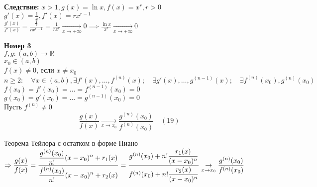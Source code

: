 \textbf{Следствие:} $x>1, g(x)=\ln {x}, f(x)=x^{r}, r>0$ \\
$g'(x)=\displaystyle\frac{1}{x}, f'(x)=rx^{r-1}$ \\
$\displaystyle\frac{g'(x)}{f'(x)}=\displaystyle\frac{\displaystyle\frac{1}{x}}{rx^{r-1}}=\displaystyle\frac{1}{rx^{r}} \underset{x\to +\infty}{\to} 0 \implies \displaystyle\frac{\ln {x}}{x^{r}} \underset{x\to +\infty}{\to} 0$
\begin{theorem}\textbf{Номер 3}\\
	$f,g: (a,b) \to \mathbb{R}$ \\
	$x_0\in(a,b)$ \\
	$f(x)\neq 0$, если $x\neq x_0$\\
	$n\ge 2: \quad \forall x \in (a,b), \exists f'(x),\ldots,f^{(n)}(x); \quad \exists g'(x),\ldots,g^{(n-1)}(x); \quad \exists f^{(n)}(x_0), g^{(n)}(x_0)$ \\
	$f(x_0)=f'(x_0)=\ldots=f^{(n-1)}(x_0)=0$ \\
	$g(x_0)=g'(x_0)=\ldots=g^{(n-1)}(x_0)=0$ \\
	Пусть $f^{(n)}\neq 0$ \\
	\[
	\displaystyle\frac{g(x)}{f(x)} \underset{x\to x_0}{\to} \displaystyle\frac{g^{(n)}(x_0)}{f^{(n)}(x_0)} \quad (19)
	\] 
\end{theorem}
\begin{replacementproof}
	 Теорема Тейлора с остатком в форме Пиано $\implies \\ \displaystyle\frac{g(x)}{f(x)}=\displaystyle\frac{\displaystyle\frac{g^{(n)}(x_0)}{n!}(x-x_0)^{n}+r_1(x)}{\displaystyle\frac{f^{(n)}(x_0)}{n!}(x-x_0)^{n}+r_2(x)}=\displaystyle\frac{g^{(n)}(x_0)+n!\displaystyle\frac{r_1(x)}{(x-x_0)^{n}}}{f^{(n)}(x_0)+n!\displaystyle\frac{r_2(x)}{(x-x_0)^{n}}} \underset{x\to x_0}{\to} \displaystyle\frac{g^{(n)}(x_0)}{f^{(n)}(x_0)}$
\end{replacementproof}

